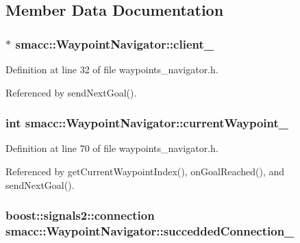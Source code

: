 \subsection{Member Data Documentation}
\subsubsection[{\texorpdfstring{client\+\_\+}{client_}}]{$\ast$ smacc\+::\+Waypoint\+Navigator\+::client\+\_\+}\hypertarget{classsmacc_1_1WaypointNavigator_a2bdb0d4aea851d877fcb20e6d0897bb8}{}\label{classsmacc_1_1WaypointNavigator_a2bdb0d4aea851d877fcb20e6d0897bb8}


Definition at line 32 of file waypoints\+\_\+navigator.\+h.



Referenced by send\+Next\+Goal().

\subsubsection[{\texorpdfstring{current\+Waypoint\+\_\+}{currentWaypoint_}}]{\setlength{\rightskip}{0pt plus 5cm}int smacc\+::\+Waypoint\+Navigator\+::current\+Waypoint\+\_\+\hspace{0.3cm}{\ttfamily [private]}}\hypertarget{classsmacc_1_1WaypointNavigator_a9a0102946593081338f7bd259f4670bc}{}\label{classsmacc_1_1WaypointNavigator_a9a0102946593081338f7bd259f4670bc}


Definition at line 70 of file waypoints\+\_\+navigator.\+h.



Referenced by get\+Current\+Waypoint\+Index(), on\+Goal\+Reached(), and send\+Next\+Goal().

\subsubsection[{\texorpdfstring{succedded\+Connection\+\_\+}{succeddedConnection_}}]{\setlength{\rightskip}{0pt plus 5cm}boost\+::signals2\+::connection smacc\+::\+Waypoint\+Navigator\+::succedded\+Connection\+\_\+\hspace{0.3cm}{\ttfamily [private]}}\hypertarget{classsmacc_1_1WaypointNavigator_a932d5378c3ef5bd4e8e3152ac657112f}{}\label{classsmacc_1_1WaypointNavigator_a932d5378c3ef5bd4e8e3152ac657112f}



